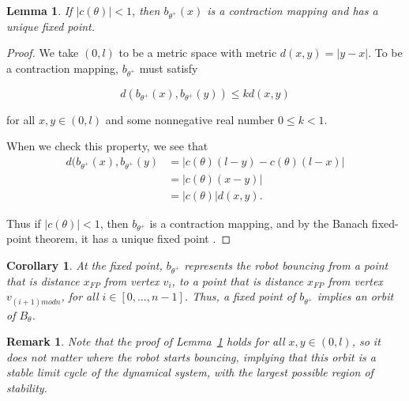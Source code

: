 \documentclass[letterpaper, 10 pt, conference]{ieeeconf}  %
\newtheorem{remark}{\bf Remark}
\newtheorem{corollary}{\bf Corollary}
\newtheorem{lemma}{\bf Lemma}
\begin{document}
\begin{lemma} \label{Lemma:2}
If $|c(\theta)| < 1$, then $b_{\theta^+}(x)$ is a contraction
mapping and has a unique fixed point.
\end{lemma}
\begin{proof}
We take $(0,l)$ to be a metric space with metric $d(x,y) =
|y-x|$. To be a contraction mapping, $b_{\theta^+}$ must satisfy

$$ d(b_{\theta^+}(x), b_{\theta^+}(y)) \leq k d(x,y) $$

for all $x, y \in (0,l)$ and some nonnegative real number $0 \leq k < 1$.

When we check this property, we see that
\begin{align*}
d(b_{\theta^+}(x), b_{\theta^+}(y) & = | c(\theta)(l-y) - c(\theta)(l-x)| \\
                               & = | c(\theta) (x-y) | \\
                               & = | c(\theta) | d(x,y).
\end{align*}

Thus if $|c(\theta)| < 1$, then $b_{\theta^+}$ is a contraction mapping, and by the Banach fixed-point
theorem, it has a unique fixed point \cite{Granas2003}.
\end{proof}
\begin{corollary} \label{corollary:sp}
At the fixed point, $b_{\theta^+}$ represents the 
robot bouncing from a point that is distance $x_{FP}$ from vertex $v_i$, to a
point that is distance $x_{FP}$ from vertex $v_{(i+1) mod n}$, for all $i \in
[0,\ldots, n-1]$.
Thus, a fixed point of $b_{\theta^+}$ implies an orbit of $B_\theta$.


\end{corollary}
\begin{remark} \label{rm1}
Note that the proof of Lemma~\ref{Lemma:2} holds for all $x,y \in
(0, l)$, so it does not matter where the robot starts bouncing,
implying that this orbit is a stable limit cycle of the dynamical system, 
with the largest possible region of stability.
\end{remark}
\end{document}
